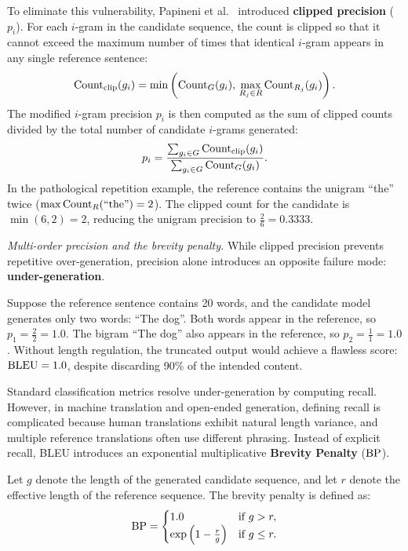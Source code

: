 \documentclass[../../../main.tex]{subfiles}
\begin{document}
To eliminate this vulnerability, Papineni et al.~\cite{papineni2002bleu} introduced \textbf{clipped precision} ($p_i$). For each $i$-gram in the candidate sequence, the count is clipped so that it cannot exceed the maximum number of times that identical $i$-gram appears in any single reference sentence:
\begin{equation}
\label{eq:clipped_ngram_count}
\operatorname{Count}_{\text{clip}}(g_i) = \min\left( \operatorname{Count}_G(g_i), \, \max_{R_j \in R} \operatorname{Count}_{R_j}(g_i) \right).
\end{equation}
The modified $i$-gram precision $p_i$ is then computed as the sum of clipped counts divided by the total number of candidate $i$-grams generated:
\begin{equation}
\label{eq:bleu_modified_precision}
p_i = \frac{\sum_{g_i \in G} \operatorname{Count}_{\text{clip}}(g_i)}{\sum_{g_i \in G} \operatorname{Count}_G(g_i)}.
\end{equation}
In the pathological repetition example, the reference contains the unigram ``the'' twice ($\max \operatorname{Count}_R(\text{``the''}) = 2$). The clipped count for the candidate is $\min(6, 2) = 2$, reducing the unigram precision to $\frac{2}{6} = 0.3333$.

\textit{Multi-order precision and the brevity penalty.} While clipped precision prevents repetitive over-generation, precision alone introduces an opposite failure mode: \textbf{under-generation}. 

Suppose the reference sentence contains 20 words, and the candidate model generates only two words: ``The dog''. Both words appear in the reference, so $p_1 = \frac{2}{2} = 1.0$. The bigram ``The dog'' also appears in the reference, so $p_2 = \frac{1}{1} = 1.0$. Without length regulation, the truncated output would achieve a flawless score: $\mathrm{BLEU} = 1.0$, despite discarding 90\% of the intended content.

Standard classification metrics resolve under-generation by computing recall. However, in machine translation and open-ended generation, defining recall is complicated because human translations exhibit natural length variance, and multiple reference translations often use different phrasing. Instead of explicit recall, BLEU introduces an exponential multiplicative \textbf{Brevity Penalty} ($\mathrm{BP}$).

Let $g$ denote the length of the generated candidate sequence, and let $r$ denote the effective length of the reference sequence. The brevity penalty is defined as:
\begin{equation}
\label{eq:brevity_penalty_def}
\mathrm{BP} = \begin{cases} 
1.0 & \text{if } g > r, \\
\exp\left( 1 - \frac{r}{g} \right) & \text{if } g \le r.
\end{cases}
\end{equation}
\end{document}
